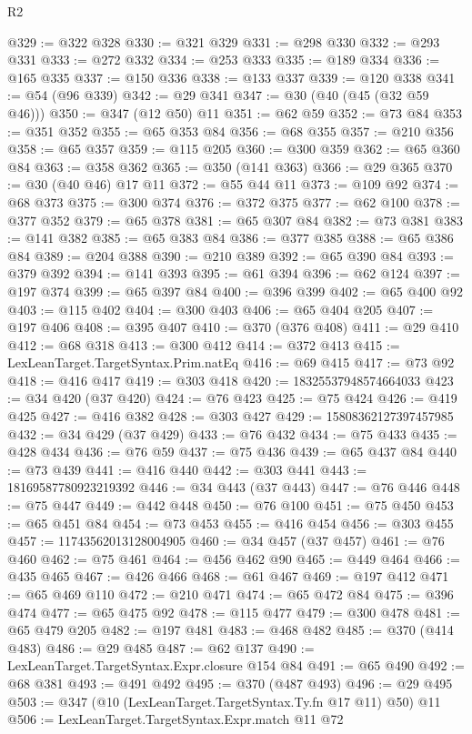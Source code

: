 \begin{lexlean}{R2}
\begin{coremodule}
@329 := @322 @328
@330 := @321 @329
@331 := @298 @330
@332 := @293 @331
@333 := @272 @332
@334 := @253 @333
@335 := @189 @334
@336 := @165 @335
@337 := @150 @336
@338 := @133 @337
@339 := @120 @338
@341 := @54 (@96 @339)
@342 := @29 @341
@347 := @30 (@40 (@45 (@32 @59 @46)))
@350 := @347 (@12 @50) @11
@351 := @62 @59
@352 := @73 @84
@353 := @351 @352
@355 := @65 @353 @84
@356 := @68 @355
@357 := @210 @356
@358 := @65 @357
@359 := @115 @205
@360 := @300 @359
@362 := @65 @360 @84
@363 := @358 @362
@365 := @350 (@141 @363)
@366 := @29 @365
@370 := @30 (@40 @46) @17 @11
@372 := @55 @44 @11
@373 := @109 @92
@374 := @68 @373
@375 := @300 @374
@376 := @372 @375
@377 := @62 @100
@378 := @377 @352
@379 := @65 @378
@381 := @65 @307 @84
@382 := @73 @381
@383 := @141 @382
@385 := @65 @383 @84
@386 := @377 @385
@388 := @65 @386 @84
@389 := @204 @388
@390 := @210 @389
@392 := @65 @390 @84
@393 := @379 @392
@394 := @141 @393
@395 := @61 @394
@396 := @62 @124
@397 := @197 @374
@399 := @65 @397 @84
@400 := @396 @399
@402 := @65 @400 @92
@403 := @115 @402
@404 := @300 @403
@406 := @65 @404 @205
@407 := @197 @406
@408 := @395 @407
@410 := @370 (@376 @408)
@411 := @29 @410
@412 := @68 @318
@413 := @300 @412
@414 := @372 @413
@415 := LexLeanTarget.TargetSyntax.Prim.natEq
@416 := @69 @415
@417 := @73 @92
@418 := @416 @417
@419 := @303 @418
@420 := 18325537948574664033
@423 := @34 @420 (@37 @420)
@424 := @76 @423
@425 := @75 @424
@426 := @419 @425
@427 := @416 @382
@428 := @303 @427
@429 := 15808362127397457985
@432 := @34 @429 (@37 @429)
@433 := @76 @432
@434 := @75 @433
@435 := @428 @434
@436 := @76 @59
@437 := @75 @436
@439 := @65 @437 @84
@440 := @73 @439
@441 := @416 @440
@442 := @303 @441
@443 := 18169587780923219392
@446 := @34 @443 (@37 @443)
@447 := @76 @446
@448 := @75 @447
@449 := @442 @448
@450 := @76 @100
@451 := @75 @450
@453 := @65 @451 @84
@454 := @73 @453
@455 := @416 @454
@456 := @303 @455
@457 := 11743562013128004905
@460 := @34 @457 (@37 @457)
@461 := @76 @460
@462 := @75 @461
@464 := @456 @462 @90
@465 := @449 @464
@466 := @435 @465
@467 := @426 @466
@468 := @61 @467
@469 := @197 @412
@471 := @65 @469 @110
@472 := @210 @471
@474 := @65 @472 @84
@475 := @396 @474
@477 := @65 @475 @92
@478 := @115 @477
@479 := @300 @478
@481 := @65 @479 @205
@482 := @197 @481
@483 := @468 @482
@485 := @370 (@414 @483)
@486 := @29 @485
@487 := @62 @137
@490 := LexLeanTarget.TargetSyntax.Expr.closure @154 @84
@491 := @65 @490
@492 := @68 @381
@493 := @491 @492
@495 := @370 (@487 @493)
@496 := @29 @495
@503 := @347 (@10 (LexLeanTarget.TargetSyntax.Ty.fn @17 @11) @50) @11
@506 := LexLeanTarget.TargetSyntax.Expr.match @11 @72

\end{coremodule}
\end{lexlean}
